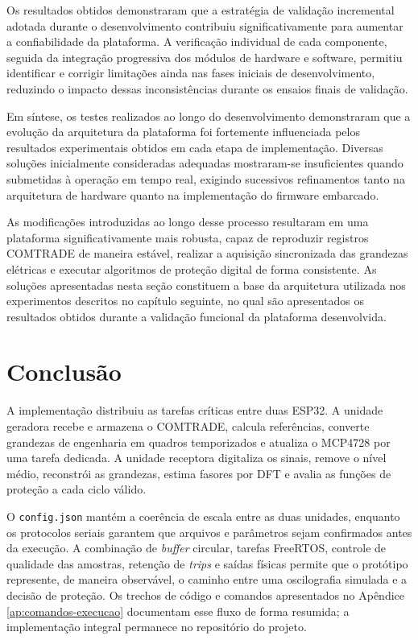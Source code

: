 Os resultados obtidos demonstraram que a estratégia de validação incremental adotada durante o desenvolvimento contribuiu significativamente para aumentar a confiabilidade da plataforma. A verificação individual de cada componente, seguida da integração progressiva dos módulos de hardware e software, permitiu identificar e corrigir limitações ainda nas fases iniciais de desenvolvimento, reduzindo o impacto dessas inconsistências durante os ensaios finais de validação.

Em síntese, os testes realizados ao longo do desenvolvimento demonstraram que a evolução da arquitetura da plataforma foi fortemente influenciada pelos resultados experimentais obtidos em cada etapa de implementação. Diversas soluções inicialmente consideradas adequadas mostraram-se insuficientes quando submetidas à operação em tempo real, exigindo sucessivos refinamentos tanto na arquitetura de hardware quanto na implementação do firmware embarcado.

As modificações introduzidas ao longo desse processo resultaram em uma plataforma significativamente mais robusta, capaz de reproduzir registros COMTRADE de maneira estável, realizar a aquisição sincronizada das grandezas elétricas e executar algoritmos de proteção digital de forma consistente. As soluções apresentadas nesta seção constituem a base da arquitetura utilizada nos experimentos descritos no capítulo seguinte, no qual são apresentados os resultados obtidos durante a validação funcional da plataforma desenvolvida.

\section{Conclusão}

A implementação distribuiu as tarefas críticas entre duas ESP32. A unidade geradora recebe e armazena o COMTRADE, calcula referências, converte grandezas de engenharia em quadros temporizados e atualiza o MCP4728 por uma tarefa dedicada. A unidade receptora digitaliza os sinais, remove o nível médio, reconstrói as grandezas, estima fasores por DFT e avalia as funções de proteção a cada ciclo válido.

O \texttt{config.json} mantém a coerência de escala entre as duas unidades, enquanto os protocolos seriais garantem que arquivos e parâmetros sejam confirmados antes da execução. A combinação de \textit{buffer} circular, tarefas FreeRTOS, controle de qualidade das amostras, retenção de \textit{trips} e saídas físicas permite que o protótipo represente, de maneira observável, o caminho entre uma oscilografia simulada e a decisão de proteção. Os trechos de código e comandos apresentados no Apêndice \ref{ap:comandos-execucao} documentam esse fluxo de forma resumida; a implementação integral permanece no repositório do projeto.
